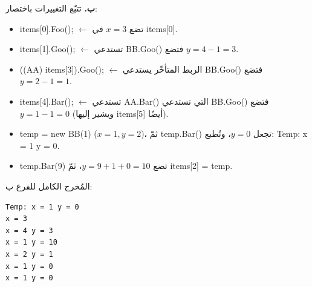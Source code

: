 \filbreak

\begin{boxSolution}
\textbf{ب.} تتبّع التغييرات باختصار:
\begin{itemize}[itemsep=0.25em]
    \item \textenglish{items[0].Foo();} $\leftarrow$ تضع $x = 3$ في \textenglish{items[0]}.
    \item \textenglish{items[1].Goo();} $\leftarrow$ تستدعي \textenglish{BB.Goo()} فتضع $y = 4 - 1 = 3$.
    \item \textenglish{((AA) items[3]).Goo();} $\leftarrow$ الربط المتأخّر يستدعي \textenglish{BB.Goo()} فتضع $y = 2 - 1 = 1$.
    \item \textenglish{items[4].Bar();} $\leftarrow$ تستدعي \textenglish{AA.Bar()} التي تستدعي \textenglish{BB.Goo()} فتضع $y = 1 - 1 = 0$ (ويشير إليها \textenglish{items[5]} أيضًا).
    \item \textenglish{temp = new BB(1)} ($x = 1, y = 2$)، ثمّ \textenglish{temp.Bar()} تجعل $y = 0$، وتُطبع: \textenglish{Temp: x = 1 y = 0}.
    \item \textenglish{temp.Bar(9)} تضع $y = 9 + 1 + 0 = 10$، ثمّ \textenglish{items[2] = temp}.
\end{itemize}

المُخرج الكامل للفرع ب:
\begin{boxCode}
\begin{english}
\begin{verbatim}
Temp: x = 1 y = 0
x = 3
x = 4 y = 3
x = 1 y = 10
x = 2 y = 1
x = 1 y = 0
x = 1 y = 0
\end{verbatim}
\end{english}
\end{boxCode}
\end{boxSolution}
\fi
\filbreak
